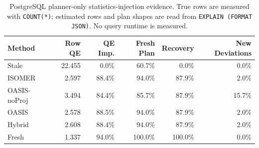 \begin{table}[t]
  \centering
  \small
  \caption{PostgreSQL planner-only statistics-injection evidence. True rows are measured with \texttt{COUNT(*)}; estimated rows and plan shapes are read from \texttt{EXPLAIN (FORMAT JSON)}. No query runtime is measured.}
  \label{tab:postgres_planner_stats_injection}
  \setlength{\tabcolsep}{4pt}
  \begin{tabular}{lrrrrr}
    \toprule
    Method & Row QE & QE Imp. & Fresh Plan & Recovery & New Deviations \\
    \midrule
    Stale & 22.455 & 0.0\% & 60.7\% & 0.0\% & 0.0\% \\
    ISOMER & 2.597 & 88.4\% & 94.0\% & 87.9\% & 2.0\% \\
    OASIS-noProj & 3.494 & 84.4\% & 85.7\% & 87.9\% & 15.7\% \\
    OASIS & 2.578 & 88.5\% & 94.0\% & 87.9\% & 2.0\% \\
    Hybrid & 2.608 & 88.4\% & 94.0\% & 87.9\% & 2.0\% \\
    Fresh & 1.337 & 94.0\% & 100.0\% & 100.0\% & 0.0\% \\
    \bottomrule
  \end{tabular}
\end{table}

